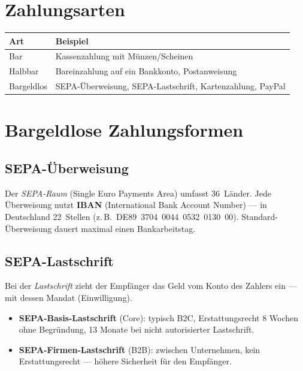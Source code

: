 \documentclass[11pt, a4paper]{article}
\begin{document}
\section{Zahlungsarten}

\begin{center}
\begin{tabular}{p{3.5cm} p{10.5cm}}
\toprule
\textbf{Art} & \textbf{Beispiel}\\
\midrule
Bar & Kassenzahlung mit Münzen/Scheinen\\
Halbbar & Bareinzahlung auf ein Bankkonto, Postanweisung\\
Bargeldlos & SEPA-Überweisung, SEPA-Lastschrift, Kartenzahlung, PayPal\\
\bottomrule
\end{tabular}
\end{center}

\section{Bargeldlose Zahlungsformen}

\subsection{SEPA-Überweisung}

Der \emph{SEPA-Raum} (Single Euro Payments Area) umfasst 36~Länder. Jede Überweisung
nutzt \textbf{IBAN} (International Bank Account Number) --- in Deutschland 22~Stellen
(z.\,B.\ DE89~3704~0044~0532~0130~00). Standard-Überweisung dauert maximal einen Bankarbeitstag.

\subsection{SEPA-Lastschrift}

Bei der \emph{Lastschrift} zieht der Empfänger das Geld vom Konto des Zahlers ein ---
mit dessen Mandat (Einwilligung).

\begin{itemize}[itemsep=2pt]
  \item \textbf{SEPA-Basis-Lastschrift} (Core): typisch B2C, Erstattungsrecht 8 Wochen ohne Begründung, 13 Monate bei nicht autorisierter Lastschrift.
  \item \textbf{SEPA-Firmen-Lastschrift} (B2B): zwischen Unternehmen, kein Erstattungsrecht --- höhere Sicherheit für den Empfänger.
\end{itemize}
\end{document}
